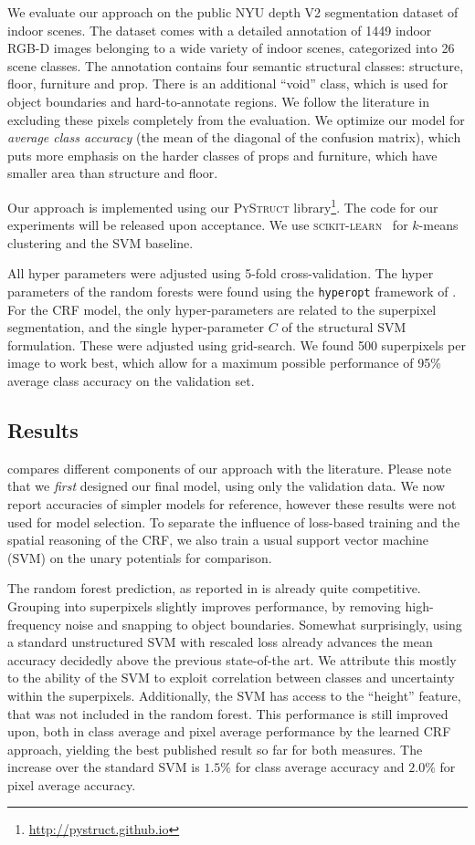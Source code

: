 We evaluate our approach on the public NYU depth V2 segmentation dataset of
indoor scenes.  The dataset comes with a detailed annotation of 1449 indoor
RGB-D images belonging to a wide variety of indoor scenes, categorized into 26
scene classes.  The annotation contains four semantic structural classes:
structure, floor, furniture and prop. There is an additional ``void'' class,
which is used for object boundaries and hard-to-annotate regions. We follow the
literature in excluding these pixels completely from the evaluation.
We optimize our model for \emph{average class accuracy} (the mean of the
diagonal of the confusion matrix), which puts more emphasis on the harder
classes of props and furniture, which have smaller area than structure and
floor.

Our approach is implemented using our \textsc{PyStruct}
library\footnote{\url{http://pystruct.github.io}}.  The code for our
experiments will be released upon acceptance. We use \textsc{scikit-learn}~\citep{pedregosa2011scikit}
for $k$-means clustering and the SVM baseline.

All hyper parameters were adjusted using 5-fold cross-validation. The
hyper parameters of the random forests were found using the \texttt{hyperopt}
framework of \cite{bergstra2011algorithms}. For the CRF model, the only
hyper-parameters are related to the superpixel segmentation, and the single
hyper-parameter $C$ of the structural SVM formulation. These were adjusted
using grid-search.
We found 500 superpixels per image to work best, which allow for a maximum
possible performance of 95\% average class accuracy on the validation set.

\subsection{Results}
 compares different components of our approach with the literature.
Please note that we \emph{first} designed our final model, using only the
validation data. We now report accuracies of simpler models for reference,
however these results were not used for model selection. To separate
the influence of loss-based training and the spatial reasoning of the CRF,
we also train a usual support vector machine (SVM) on the unary potentials for comparison.

The random forest prediction, as reported in \citet{stueckler2013} is already quite competitive.
Grouping into superpixels slightly improves performance, by removing
high-frequency noise and snapping to object boundaries. Somewhat surprisingly,
using a standard unstructured SVM with rescaled loss already advances the mean
accuracy decidedly above the previous state-of-the art. We
attribute this mostly to the ability of the SVM to exploit correlation between
classes and uncertainty within the superpixels.
Additionally, the SVM has access to the ``height'' feature, that was not
included in the random forest.
This performance is still improved upon, both in class average and pixel
average performance by the learned CRF approach, yielding
the best published result so far for both measures. The increase over the
standard SVM is $1.5\%$ for class average accuracy and $2.0\%$ for pixel
average accuracy.

